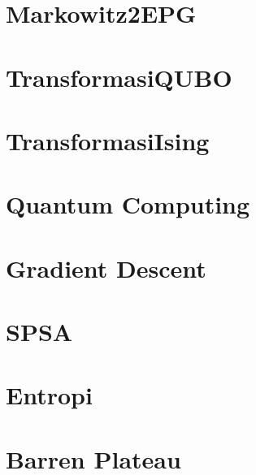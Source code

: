 \documentclass{article}
\begin{document}
\section*{Markowitz2EPG}


\section*{TransformasiQUBO}


\section*{TransformasiIsing}


\section*{Quantum Computing}


\section*{Gradient Descent}


\section*{SPSA}


\section*{Entropi}


\section*{Barren Plateau}

\end{document}
